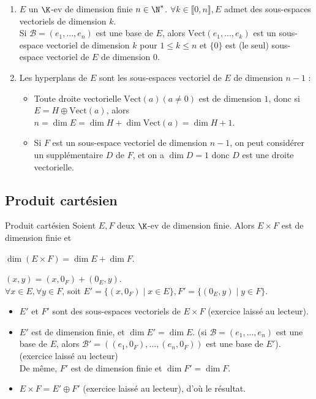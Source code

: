 \documentclass[12pt, a4paper]{report}
\begin{document}
\begin{remarque}
\begin{enumerate}
	\item $E$ un $\K$-ev de dimension finie $n \in \N^*$. $\forall k \in \llbracket 0,n \rrbracket, E$ admet des sous-espaces vectoriels de dimension $k$. \\
	Si $\mathcal{B} = (e_1,...,e_n)$ est une base de $E$, alors $\text{Vect}(e_1,...,e_k)$ est un sous-espace vectoriel de dimension $k$ pour $1 \le k \le n$ et $\{0\}$ est (le seul) sous-espace vectoriel de $E$ de dimension $0$.
	
	\item Les hyperplans de $E$ sont les sous-espaces vectoriel de $E$ de dimension $n-1$ :
	\begin{itemize}
		\item Toute droite vectorielle $\text{Vect}(a) (a \ne 0)$ est de dimension $1$, donc si $E = H \oplus \text{Vect}(a)$, alors $n = \dim E = \dim H + \dim \text{Vect}(a) = \dim H + 1$.
		\item Si $F$ est un sous-espace vectoriel de dimension $n-1$, on peut considérer un supplémentaire $D$ de $F$, et on a $\dim D = 1$ donc $D$ est une droite vectorielle.
	\end{itemize}
\end{enumerate}
\end{remarque}

\subsection{Produit cartésien}

\begin{theoreme}{Produit cartésien}{}
Soient $E,F$ deux $\K$-ev de dimension finie. Alors $E \times F$ est de dimension finie et 
\begin{center}
$\dim (E \times F) = \dim E + \dim F$.
\end{center}
\end{theoreme}

\begin{demo}{}
$(x,y) = (x,0_F)+(0_E,y)$. \\
$\forall x \in E, \forall y \in F$, soit $E' = \{(x,0_F) \mid x \in E\}, F' = \{(0_E,y) \mid y \in F\}$.
\begin{itemize}
	\item $E'$ et $F'$ sont des sous-espaces vectoriels de $E \times F$ (exercice laissé au lecteur). \\
	\item $E'$ est de dimension finie, et $\dim E' = \dim E$. (si $\mathcal{B} = (e_1,...,e_n)$ est une base de $E$, alors $\mathcal{B}' = ((e_1,0_F),...,(e_n,0_F))$ est une base de $E'$). (exercice laissé au lecteur) \\
	De même, $F'$ est de dimension finie et $\dim F' = \dim F$.
	\item $E \times F = E' \oplus F'$ (exercice laissé au lecteur), d'où le résultat.
\end{itemize}
\end{demo}
\end{document}

